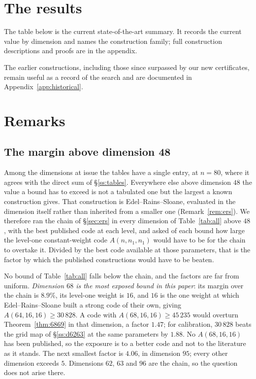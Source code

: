 \documentclass[11pt]{amsart}
\theoremstyle{remark}
\begin{document}
\section{The results}\label{sec:results}

The table below is the current state-of-the-art summary. It records the current
value by dimension and names the construction family; full construction
descriptions and proofs are in the appendix.



The earlier constructions, including those since surpassed by our new
certificates, remain useful as a record of the search and are documented in Appendix~\ref{app:historical}.

\section{Remarks}\label{sec:remarks}

\subsection{The margin above dimension 48}\label{ss:exposure}

Among the dimensions at issue the tables have a single entry, at $n=80$, where it
agrees with the direct sum of \S\ref{ss:tables}. Everywhere else above dimension
$48$ the value a bound has to exceed is not a tabulated one but the largest a known
construction gives. That construction
is Edel--Rains--Sloane, evaluated in the dimension itself rather than inherited
from a smaller one (Remark~\ref{rem:ers}). We therefore ran the chain of
\S\ref{sec:ers} in every dimension of Table~\ref{tab:all} above $48$, with the
best published code at each level, and asked of each bound how large the
level-one constant-weight code $A(n,n_1,n_1)$ would have to be for the chain to
overtake it. Divided by the best code available at those parameters, that is the
factor by which the published constructions would have to be beaten.

No bound of Table~\ref{tab:all} falls below the chain, and the factors are far
from uniform. \emph{Dimension $68$ is the
most exposed bound in this paper}: its margin over the chain is $8.9\%$, its
level-one weight is $16$, and $16$ is the one weight at which Edel--Rains--Sloane
built a strong code of their own, giving $A(64,16,16)\ge30\,828$. A code with
$A(68,16,16)\ge45\,235$ would overturn Theorem~\ref{thm:6869} in that dimension,
a factor $1.47$; for calibration, $30\,828$ beats the grid map of
\S\ref{ss:d6263} at the same parameters by $1.88$. No $A(68,16,16)$ has been
published, so the exposure is to a better code and not to the literature as it
stands. The next smallest factor is $4.06$, in dimension $95$; every other
dimension exceeds $5$. Dimensions $62$, $63$ and $96$ are the chain, so the question
does not arise there.
\end{document}
